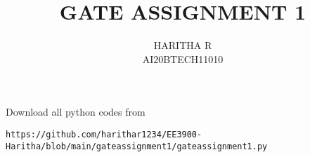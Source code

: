 \documentclass[journal,12pt,twocolumn]{IEEEtran}
\begin{document}
\let\vec\mathbf
\renewcommand{\thefigure}{\theproblem}
\def\putbox#1#2#3{\makebox[0in][l]{\makebox[#1][l]{}\raisebox{\baselineskip}[0in][0in]{\raisebox{#2}[0in][0in]{#3}}}}
     \def\rightbox#1{\makebox[0in][r]{#1}}
     \def\centbox#1{\makebox[0in]{#1}}
     \def\topbox#1{\raisebox{-\baselineskip}[0in][0in]{#1}}
     \def\midbox#1{\raisebox{-0.5\baselineskip}[0in][0in]{#1}}
\vspace{3cm}
\title{GATE ASSIGNMENT 1}
\author{HARITHA R\\ AI20BTECH11010}
\maketitle
\newpage
\bigskip
\renewcommand{\thefigure}{\arabic{figure}}
\renewcommand{\thetable}{\arabic{table}}
Download all python codes from
\begin{lstlisting}
https://github.com/harithar1234/EE3900-Haritha/blob/main/gateassignment1/gateassignment1.py
\end{lstlisting}
\end{document}
